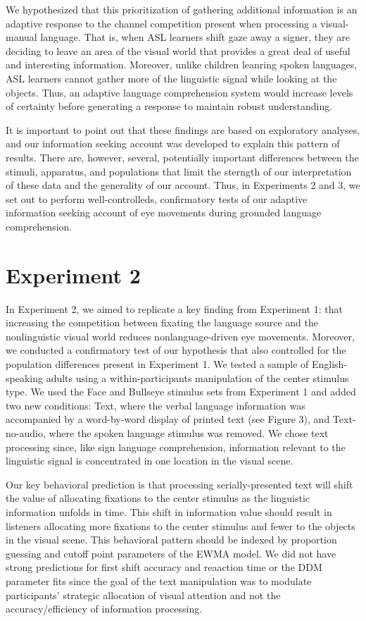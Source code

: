 \documentclass[english,floatsintext,man]{apa6}
\theoremstyle{definition}
\theoremstyle{definition}
\theoremstyle{definition}
\theoremstyle{remark}
\begin{document}
We hypothesized that this prioritization of gathering additional
information is an adaptive response to the channel competition present
when processing a visual-manual language. That is, when ASL learners
shift gaze away a signer, they are deciding to leave an area of the
visual world that provides a great deal of useful and interesting
information. Moreover, unlike children leanring spoken languages, ASL
learners cannot gather more of the linguistic signal while looking at
the objects. Thus, an adaptive language comprehension system would
increase levels of certainty before generating a response to maintain
robust understanding.

It is important to point out that these findings are based on
exploratory analyses, and our information seeking account was developed
to explain this pattern of results. There are, however, several,
potentially important differences between the stimuli, apparatus, and
populations that limit the sterngth of our interpretation of these data
and the generality of our account. Thus, in Experiments 2 and 3, we set
out to perform well-controlleds, confirmatory tests of our adaptive
information seeking account of eye movements during grounded language
comprehension.

\hypertarget{experiment-2}{%
\section{Experiment 2}\label{experiment-2}}

In Experiment 2, we aimed to replicate a key finding from Experiment 1:
that increasing the competition between fixating the language source and
the nonlinguistic visual world reduces nonlanguage-driven eye movements.
Moreover, we conducted a confirmatory test of our hypothesis that also
controlled for the population differences present in Experiment 1. We
tested a sample of English-speaking adults using a within-participants
manipulation of the center stimulus type. We used the Face and Bullseye
stimulus sets from Experiment 1 and added two new conditions: Text,
where the verbal language information was accompanied by a word-by-word
display of printed text (see Figure 3), and Text-no-audio, where the
spoken language stimulus was removed. We chose text processing since,
like sign language comprehension, information relevant to the linguistic
signal is concentrated in one location in the visual scene.

Our key behavioral prediction is that processing serially-presented text
will shift the value of allocating fixations to the center stimulus as
the linguistic information unfolds in time. This shift in information
value should result in listeners allocating more fixations to the center
stimulus and fewer to the objects in the visual scene. This behavioral
pattern should be indexed by proportion guessing and cutoff point
parameters of the EWMA model. We did not have strong predictions for
first shift accuracy and reaaction time or the DDM parameter fits since
the goal of the text manipulation was to modulate participants'
strategic allocation of visual attention and not the accuracy/efficiency
of information processing.
\end{document}
